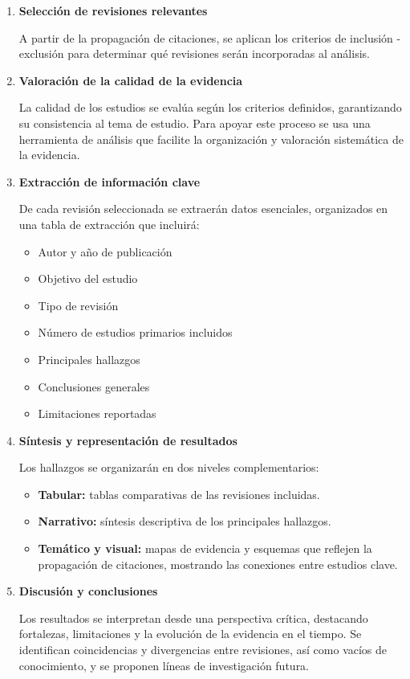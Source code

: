 \begin{enumerate}
    \item \textbf{Selección de revisiones relevantes}  

    A partir de la propagación de citaciones, se aplican los criterios de inclusión - exclusión para determinar qué revisiones serán incorporadas al análisis.
    

    \item \textbf{Valoración de la calidad de la evidencia}  

    La calidad de los estudios se evalúa según los criterios definidos, garantizando su consistencia al tema de estudio.
    Para apoyar este proceso se usa una herramienta de análisis que facilite la organización y valoración sistemática de la evidencia.

    \item \textbf{Extracción de información clave}  

    De cada revisión seleccionada se extraerán datos esenciales, organizados en una tabla de extracción que incluirá:  
    \begin{itemize}
        \item Autor y año de publicación  
        \item Objetivo del estudio  
        \item Tipo de revisión  
        \item Número de estudios primarios incluidos  
        \item Principales hallazgos  
        \item Conclusiones generales  
        \item Limitaciones reportadas  
    \end{itemize}

    \item \textbf{Síntesis y representación de resultados}  

    Los hallazgos se organizarán en dos niveles complementarios:  
    \begin{itemize}
        \item \textbf{Tabular:} tablas comparativas de las revisiones incluidas.
        \item \textbf{Narrativo:} síntesis descriptiva de los principales hallazgos.  
        \item \textbf{Temático y visual:} mapas de evidencia y esquemas que reflejen la propagación de citaciones, mostrando las conexiones entre estudios clave.  
    \end{itemize}

    \item \textbf{Discusión y conclusiones}  

    Los resultados se interpretan desde una perspectiva crítica, destacando fortalezas, limitaciones y la evolución de la evidencia en el tiempo. Se identifican coincidencias y divergencias entre revisiones, así como vacíos de conocimiento, y se proponen líneas de investigación futura.
\end{enumerate}
